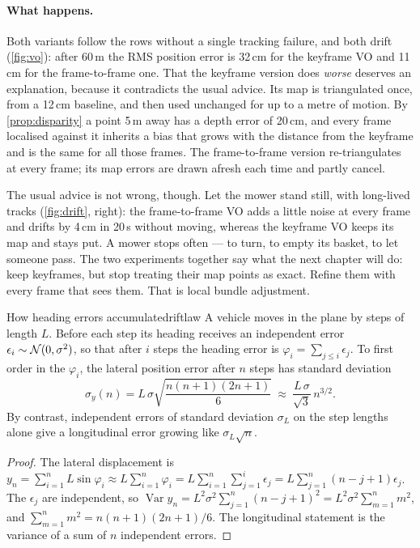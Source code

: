 \paragraph{What happens.} Both variants follow the rows without a single
tracking failure, and both drift (\cref{fig:vo}): after 60\,m the RMS
position error is 32\,cm for the keyframe VO and 11\,cm for the
frame-to-frame one. That the keyframe version does \emph{worse} deserves
an explanation, because it contradicts the usual advice. Its map is
triangulated once, from a 12\,cm baseline, and then used unchanged for
up to a metre of motion. By \cref{prop:disparity} a point 5\,m away has
a depth error of 20\,cm, and every frame localised against it inherits a
bias that grows with the distance from the keyframe and is the same for
all those frames. The frame-to-frame version re-triangulates at every
frame; its map errors are drawn afresh each time and partly cancel.

The usual advice is not wrong, though. Let the mower stand still, with
long-lived tracks (\cref{fig:drift}, right): the frame-to-frame VO adds
a little noise at every frame and drifts by 4\,cm in 20\,s without
moving, whereas the keyframe VO keeps its map and stays put. A mower
stops often --- to turn, to empty its basket, to let someone pass. The
two experiments together say what the next chapter will do: keep
keyframes, but stop treating their map points as exact. Refine them with
every frame that sees them. That is local bundle adjustment.

\begin{proposition}{How heading errors accumulate}{driftlaw}
A vehicle moves in the plane by steps of length $L$. Before each step its
heading receives an independent error $\epsilon_i\sim\mathcal{N}(0,\sigma^2)
$, so that after $i$ steps the heading error is $\varphi_i=\sum_{j\le i}
\epsilon_j$. To first order in the $\varphi_i$, the lateral position
error after $n$ steps has standard deviation
\[
\sigma_y(n)=L\,\sigma\sqrt{\frac{n(n+1)(2n+1)}6}\ \approx\ \frac{L\,
\sigma}{\sqrt3}\,n^{3/2} .
\]
By contrast, independent errors of standard deviation $\sigma_L$ on the
step lengths alone give a longitudinal error growing like $\sigma_L
\sqrt n$.
\end{proposition}

\begin{proof}
The lateral displacement is $y_n=\sum_{i=1}^nL\sin\varphi_i\approx L
\sum_{i=1}^n\varphi_i=L\sum_{i=1}^n\sum_{j=1}^i\epsilon_j=L\sum_{j=1}^n
(n-j+1)\epsilon_j$. The $\epsilon_j$ are independent, so
$\operatorname{Var}y_n=L^2\sigma^2\sum_{j=1}^n(n-j+1)^2=L^2\sigma^2
\sum_{m=1}^nm^2$, and $\sum_{m=1}^nm^2=n(n+1)(2n+1)/6$. The longitudinal
statement is the variance of a sum of $n$ independent errors.
\end{proof}

